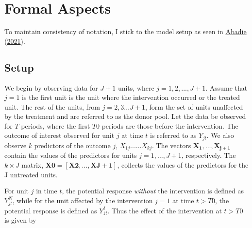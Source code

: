\documentclass[12pt,nobind, a4paper]{reedthesis}
\begin{document}
 \hypertarget{formal-aspects}{%
 \section{Formal Aspects}\label{formal-aspects}}

 To maintain consistency of notation, I stick to the model setup as seen in \protect\hyperlink{ref-abadie_using_2021}{Abadie} (\protect\hyperlink{ref-abadie_using_2021}{2021}).

 \hypertarget{setup}{%
 \subsection{Setup}\label{setup}}

 We begin by observing data for \(J+1\) units, where \(j=1,2,...,J+1\). Assume that \(j=1\) is the first unit is the unit where the intervention occurred or the treated unit. The rest of the units, from \(j=2,3...J+1\), form the set of units unaffected by the treatment and are referred to as the donor pool. Let the data be observed for \(T\) periods, where the first \(T0\) periods are those before the intervention. The outcome of interest observed for unit \(j\) at time \(t\) is referred to as \(Y_{jt}\). We also observe \(k\) predictors of the outcome \(j\), \(X_{1j}......X_{kj}\). The vectors \(\mathbf{X_{1},…,X_{j+1}}\) contain the values of the predictors for units \(j = 1,…,J + 1\), respectively. The \(k \times J\) matrix, \(\mathbf{X0} = [\mathbf{X2},..., \mathbf{XJ+1}]\), collects the values of the predictors for the J untreated units.
 \linebreak

 For unit \(j\) in time \(t\), the potential response \emph{without} the intervention is defined as \(Y^{N}_{jt}\), while for the unit affected by the intervention \(j=1\) at time \(t>T0\), the potential response is defined as \(Y^{I}_{1t}\). Thus the effect of the intervention at \(t>T0\) is given by
\end{document}
